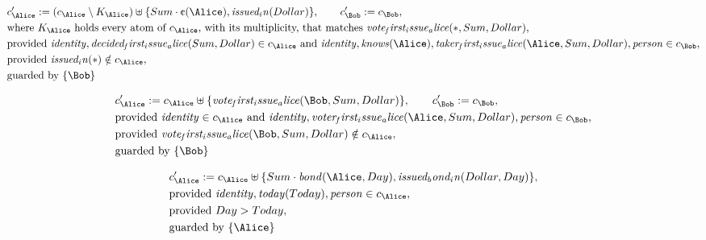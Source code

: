 \begin{align*}
&
c'_
{
\Alice
}
 := 
(
c_
{
\Alice
}
 \setminus K_
{
\Alice
}
) \uplus 
\{
Sum
\cdot
\text{\textcent}
(
\Alice
)
,
\mathit{
issued_in
}
(
Dollar
)
\}
, \qquad 
c'_
{
\Bob
}
 := 
c_
{
\Bob
}
,\\
&
\text{where } K_
{
\Alice
}
 \text{ holds every atom of } c_
{
\Alice
}
 \text{, with its multiplicity, that matches } 
\mathit{
vote_first_issue_alice
}
(
\ast
,
Sum
,
Dollar
)
,\\
&
\text{provided } 
\mathit{
identity
}
,
\mathit{
decided_first_issue_alice
}
(
Sum
,
Dollar
)
 \in c_
{
\Alice
}
 \text{ and } 
\mathit{
identity
}
,
\mathit{
knows
}
(
\Alice
)
,
\mathit{
taker_first_issue_alice
}
(
\Alice
,
Sum
,
Dollar
)
,
\mathit{
person
}
 \in c_
{
\Bob
}
,\\
&
\text{provided } 
\mathit{
issued_in
}
(
\ast
)
 \notin c_
{
\Alice
}
,\\
&
\text{guarded by } \{
\Bob
\}
\end{align*}

\begin{align*}
&
c'_
{
\Alice
}
 := 
c_
{
\Alice
}
 \uplus 
\{
\mathit{
vote_first_issue_alice
}
(
\Bob
,
Sum
,
Dollar
)
\}
, \qquad 
c'_
{
\Bob
}
 := 
c_
{
\Bob
}
,\\
&
\text{provided } 
\mathit{
identity
}
 \in c_
{
\Alice
}
 \text{ and } 
\mathit{
identity
}
,
\mathit{
voter_first_issue_alice
}
(
\Alice
,
Sum
,
Dollar
)
,
\mathit{
person
}
 \in c_
{
\Bob
}
,\\
&
\text{provided } 
\mathit{
vote_first_issue_alice
}
(
\Bob
,
Sum
,
Dollar
)
 \notin c_
{
\Alice
}
,\\
&
\text{guarded by } \{
\Bob
\}
\end{align*}

\begin{align*}
&
c'_
{
\Alice
}
 := 
c_
{
\Alice
}
 \uplus 
\{
Sum
\cdot
\mathit{
bond
}
(
\Alice
,
Day
)
,
\mathit{
issued_bond_in
}
(
Dollar
,
Day
)
\}
,\\
&
\text{provided } 
\mathit{
identity
}
,
\mathit{
today
}
(
Today
)
,
\mathit{
person
}
 \in c_
{
\Alice
}
,\\
&
\text{provided } 
Day
>
Today
,\\
&
\text{guarded by } \{
\Alice
\}
\end{align*}


